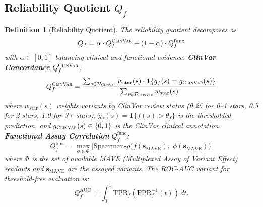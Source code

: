 \documentclass[11pt,a4paper]{article}
\newtheorem{definition}[theorem]{Definition}
\theoremstyle{definition}
\newcommand{\ind}{\mathbf{1}}
\newcommand{\calD}{\mathcal{D}}
\newcommand{\ClinVar}{\textsc{ClinVar}}
\begin{document}
\subsection{Reliability Quotient $Q_f$}
\begin{definition}[Reliability Quotient]
The reliability quotient decomposes as
\begin{equation}
    Q_f = \alpha \cdot Q_f^{\ClinVar} + (1-\alpha) \cdot Q_f^{\text{func}}
\end{equation}
with $\alpha \in [0,1]$ balancing clinical and functional evidence.
\medskip\noindent\textbf{ClinVar Concordance} $Q_f^{\ClinVar}$:
\begin{equation}
    Q_f^{\ClinVar} = \frac{\sum_{s \in \calD_{\ClinVar}} w_{\text{star}}(s) \cdot \ind\{\hat{g}_f(s) = g_{\ClinVar}(s)\}}{\sum_{s \in \calD_{\ClinVar}} w_{\text{star}}(s)}
\end{equation}
where $w_{\text{star}}(s)$ weights variants by ClinVar review status (0.25 for 0--1 stars, 0.5 for 2 stars, 1.0 for 3+ stars), $\hat{g}_f(s) = \ind\{f(s) > \theta_f\}$ is the thresholded prediction, and $g_{\ClinVar}(s) \in \{0,1\}$ is the ClinVar clinical annotation.
\medskip\noindent\textbf{Functional Assay Correlation} $Q_f^{\text{func}}$:
\begin{equation}
    Q_f^{\text{func}} = \max_{\phi \in \Phi} \big| \text{Spearman-}\rho\big(f(\mathbf{s}_{\text{MAVE}}),\; \phi(\mathbf{s}_{\text{MAVE}})\big) \big|
\end{equation}
where $\Phi$ is the set of available MAVE (Multiplexed Assay of Variant Effect) readouts and $\mathbf{s}_{\text{MAVE}}$ are the assayed variants.
The ROC-AUC variant for threshold-free evaluation is:
\begin{equation}
    Q_f^{\text{AUC}} = \int_0^1 \text{TPR}_f(\text{FPR}^{-1}_f(t)) \, dt.
\end{equation}
\end{definition}
\end{document}
